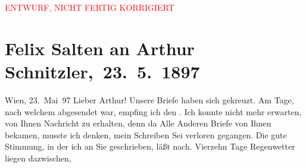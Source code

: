 
\begin{center}
            \textcolor{red}{ENTWURF, NICHT FERTIG KORRIGIERT}
                      \end{center}
            
         
         \renewcommand{\erwaehntePersonen}{Personen: Richard Beer-Hofmann,  Elisabeth von Österreich-Ungarn,  Franz Joseph I. von Österreich-Ungarn, Paul Goldmann, Hugo von Hofmannsthal, Richard Metzl, Louise Metzl, Felix Salten, Ottilie Salten, Adele Sandrock}
         \renewcommand{\erwaehnteInstitutionen}{Institutionen: Franz-Joseph-Orden}
         \renewcommand{\erwaehnteOrte}{Orte: London, Ostsee, Paris, Riga, Russland, Wien}
         \renewcommand{\erwaehnteWerke}{}
               \section[ Felix Salten an Arthur Schnitzler, 23. 5. 1897]{ Felix Salten an Arthur Schnitzler, 23. 5. 1897}\nopagebreak{}\rehead{ }\begin{ledgroupsized}[t]{13cm}\normalsize\beginnumbering{} \toendnotes[C]{\smallbreak\pagebreak[2]} 
\toendnotes[C]{\smallbreak}\pstart
           \raggedleft{}{\pb}Wien, 23. Mai 97\pend
           \pstart
           Lieber Arthur! Unsere Briefe haben sich gekreuzt. Am Tage, nach
               welchem \label{K_L03266-1v}\label{K_L03266-1h} abgesendet war, empfing ich den \label{K_L03266-2v}\label{K_L03266-2h}. Ich konnte nicht mehr erwarten, von
               Ihnen Nachricht zu erhalten, denn da Alle Anderen Briefe von Ihnen bekamen, musste
               ich denken, mein Schreiben Sei verloren gegangen.\pend
           \pstart
           Die gute Stimmung, in der ich \label{K_L03266-3v}\label{K_L03266-3h} an Sie geschrieben, läßt nach. Vierzehn Tage Regenwetter liegen dazwischen,

\end{ledgroupsized}
